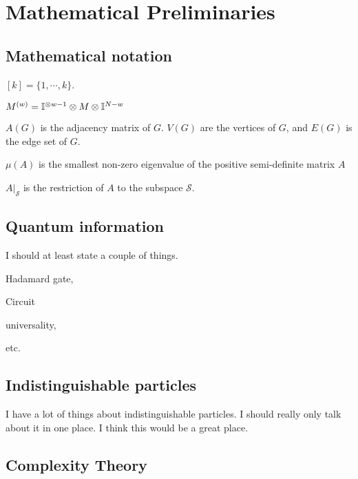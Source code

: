 \documentclass[../thesis-main/thesis-main]{subfiles}
\begin{document}
\chapter{Mathematical Preliminaries}
\label{chap:mathematical_preliminaries}

\section{Mathematical notation}
\label{sec:mathematical_notation}


$[k] = \{1,\cdots, k\}$.

$M^{(w)} = \mathbb{I}^{\otimes w-1} \otimes M \otimes \mathbb{I}^{N- w}$

$A(G)$ is the adjacency matrix of $G$.  $V(G)$ are the vertices of $G$, and $E(G)$ is the edge set of $G$.

$\mu(A)$ is the smallest non-zero eigenvalue of the positive semi-definite matrix $A$

$A\big|_\mathcal{S}$ is the restriction of $A$ to the subspace $\mathcal{S}$.

\section{Quantum information}
\label{sec:quantum_information}


I should at least state a couple of things.

Hadamard gate,

Circuit

universality,

etc.


\section{Indistinguishable particles}
\label{sec:indistinguishable_particles}

I have a lot of things about indistinguishable particles.  I should really only talk about it in one place.  I think this would be a great place.



\section{Complexity Theory}
\label{sec:completity_theory}
\end{document}
